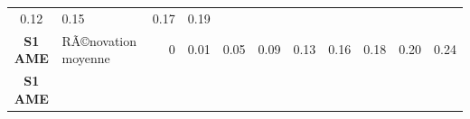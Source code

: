 \documentclass[]{article}
\begin{document}
\begin{longtable}[]{@{}clrrrrrrrrr@{}}
\begin{minipage}[t]{0.05\columnwidth}
0.12\strut
\end{minipage} & \begin{minipage}[t]{0.05\columnwidth}\raggedleft\strut
0.15\strut
\end{minipage} & \begin{minipage}[t]{0.05\columnwidth}\raggedleft\strut
0.17\strut
\end{minipage} & \begin{minipage}[t]{0.05\columnwidth}\raggedleft\strut
0.19\strut
\end{minipage}\tabularnewline
\begin{minipage}[t]{0.12\columnwidth}\centering\strut
\textbf{S1 AME}\strut
\end{minipage} & \begin{minipage}[t]{0.17\columnwidth}\raggedright\strut
RÃ©novation moyenne\strut
\end{minipage} & \begin{minipage}[t]{0.05\columnwidth}\raggedleft\strut
0\strut
\end{minipage} & \begin{minipage}[t]{0.05\columnwidth}\raggedleft\strut
0.01\strut
\end{minipage} & \begin{minipage}[t]{0.05\columnwidth}\raggedleft\strut
0.05\strut
\end{minipage} & \begin{minipage}[t]{0.05\columnwidth}\raggedleft\strut
0.09\strut
\end{minipage} & \begin{minipage}[t]{0.05\columnwidth}\raggedleft\strut
0.13\strut
\end{minipage} & \begin{minipage}[t]{0.05\columnwidth}\raggedleft\strut
0.16\strut
\end{minipage} & \begin{minipage}[t]{0.05\columnwidth}\raggedleft\strut
0.18\strut
\end{minipage} & \begin{minipage}[t]{0.05\columnwidth}\raggedleft\strut
0.20\strut
\end{minipage} & \begin{minipage}[t]{0.05\columnwidth}\raggedleft\strut
0.24\strut
\end{minipage}\tabularnewline
\begin{minipage}[t]{0.12\columnwidth}\centering\strut
\textbf{S1 AME}\strut
\end{minipage} & \begin{minipage}[t]{0.17\columnwidth}\raggedright\strut

\end{minipage}
\end{longtable}
\end{document}
